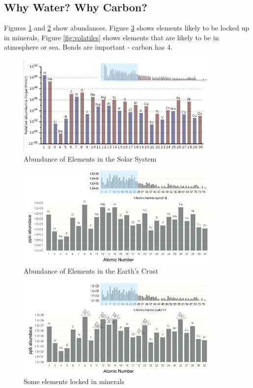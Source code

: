 \documentclass[]{article}
\begin{document}
\subsection{Why Water? Why Carbon?}
Figures \ref{fig:abundances1} and \ref{fig:abundances2} show abundances. Figure \ref{fig:minerals} shows elements likely to be locked up in minerals, Figure \ref{fig:volatiles} shows elements that are likely to be in atmosphere or sea. Bonds are important - carbon has 4.

\begin{figure}[H]
	\caption{Abundance of Elements in the Solar System}\label{fig:abundances1} 
	\includegraphics[width=0.9\textwidth]{Abundances}
\end{figure}

\begin{figure}[H]
	\caption{Abundance of Elements in the Earth's Crust}\label{fig:abundances2}  
	\includegraphics[width=0.9\textwidth]{AbundancesEarth}
\end{figure}

\begin{figure}[H]
	\caption{Some elements locked in minerals}\label{fig:minerals} 
	\includegraphics[width=0.9\textwidth]{AbundancesMinerals}
\end{figure}
\end{document}
